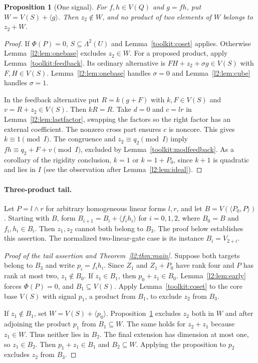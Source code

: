 \documentclass[11pt,a4paper]{article}
\theoremstyle{plain}
\newtheorem{proposition}[theorem]{Proposition}
\theoremstyle{remark}
\theoremstyle{plain}
\begin{document}
\begin{proposition}[One signal]\label{l2:prop:onehigh}
For $f,h\in V(Q)$ and $g=fh$, put $W=V(S)+\langle g\rangle$. Then $z_2\notin W$, and no product of two elements of $W$ belongs to $z_2+W$.
\end{proposition}
\begin{proof}
If $\Phi(P)=0$, $S\subseteq\Lambda^2(U)$ and Lemma~\ref{toolkit:coset} applies. Otherwise Lemma~\ref{l2:lem:onebase} excludes $z_2\in W$. For a proposed product, apply Lemma~\ref{toolkit:feedback}. Its ordinary alternative is $FH+z_2+\sigma g\in V(S)$ with $F,H\in V(S)$. Lemma~\ref{l2:lem:onebase} handles $\sigma=0$ and Lemma~\ref{l2:lem:cube} handles $\sigma=1$.

In the feedback alternative put $R=k(g+F)$ with $k,F\in V(S)$ and $v=R+z_2\in V(S)$. Then $kR=R$. Take $d=0$ and $c=lr$ in Lemma~\ref{l2:lem:lastfactor}, swapping the factors so the right factor has an external coefficient. The nonzero cross part ensures $c$ is noncore. This gives $k\equiv1\pmod I$. The congruence and $z_2\equiv q_2\pmod I$ imply $fh\equiv q_2+F+v\pmod I$, excluded by Lemma~\ref{toolkit:modfeedback}. As a corollary of the rigidity conclusion, $k=1$ or $k=1+P_0$, since $k+1$ is quadratic and lies in $I$ (see the observation after Lemma~\ref{l2:lem:ideal}).
\end{proof}

\paragraph{Three-product tail.}
Let $P=l\wedge r$ for arbitrary homogeneous linear forms $l,r$,
and let $B=V(\langle P_0,P\rangle)$. Starting with $B$, form
$B_{i+1}=B_i+\langle f_i h_i\rangle$ for $i=0,1,2$, where
$B_0=B$ and $f_i,h_i\in B_i$. Then $z_1,z_2$ cannot both belong
to $B_3$. The proof below establishes this assertion. The normalized
two-linear-gate case is its instance $B_i=V_{2+i}$.

\begin{proof}[Proof of the tail assertion and Theorem~\ref{l2:thm:main}]
Suppose both targets belong to $B_3$ and write $p_i=f_ih_i$. Since $Z_1$ and $Z_1+P_0$ have rank four and $P$ has rank at most two, $z_1\notin B_0$. If $z_1\in B_1$, then $p_0+z_1\in B_0$. Lemma~\ref{l2:lem:early} forces $\Phi(P)=0$, and $B_1\subseteq V(S)$. Apply Lemma~\ref{toolkit:coset} to the core base $V(S)$ with signal $p_1$, a product from $B_1$, to exclude $z_2$ from $B_3$.

If $z_1\notin B_1$, set $W=V(S)+\langle p_0\rangle$. Proposition~\ref{l2:prop:onehigh} excludes $z_2$ both in $W$ and after adjoining the product $p_1$ from $B_1\subseteq W$. The same holds for $z_2+z_1$ because $z_1\in W$. Thus neither lies in $B_2$. The final extension has dimension at most one, so $z_1\in B_2$. Then $p_1+z_1\in B_1$ and $B_2\subseteq W$. Applying the proposition to $p_2$ excludes $z_2$ from $B_3$.
\end{proof}
\end{document}
